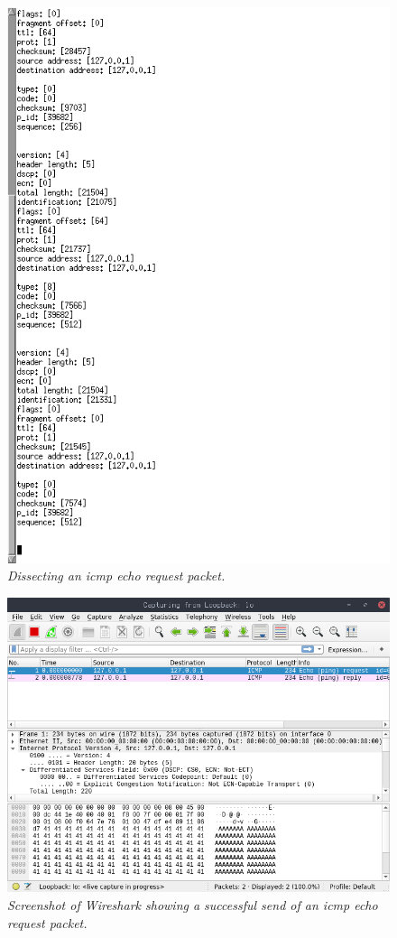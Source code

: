 \documentclass[titlepage]{article}
\begin{document}
\begin{figure}[H]
  \centering
  \includegraphics[width=\textwidth]{deconstructed_headers.png}
  \caption{\textit{%
    Dissecting an \gls{icmp} echo request packet.
}}\label{echodissect}
\end{figure}

\begin{figure}[H]
  \centering
  \includegraphics[width=\textwidth]{ping_send_success.png}
  \caption{\textit{%
    Screenshot of Wireshark showing a successful send of an \gls{icmp} echo request packet.
}}\label{pingsuccess}
\end{figure}
\end{document}
